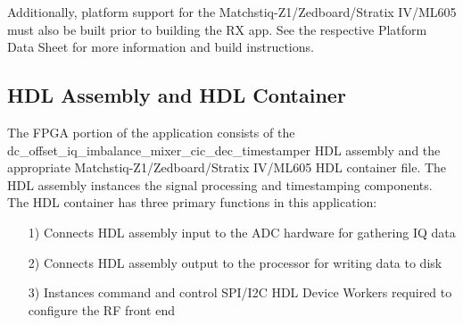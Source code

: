 \noindent Additionally, platform support for the Matchstiq-Z1/Zedboard/Stratix IV/ML605 must also be built prior to building the RX app. See the respective Platform Data Sheet for more information and build instructions.
\newpage

\subsection{HDL Assembly and HDL Container}
The FPGA portion of the application consists of the dc\_offset\_iq\_imbalance\_mixer\_cic\_dec\_timestamper HDL assembly and the appropriate  Matchstiq-Z1/Zedboard/Stratix IV/ML605 HDL container file. The HDL assembly instances the signal processing and timestamping components. The HDL container has three primary functions in this application:
\begin{itemize}
	\item[1)] Connects HDL assembly input to the ADC hardware for gathering IQ data
	\item[2)] Connects HDL assembly output to the processor for writing data to disk
	\item[3)] Instances command and control SPI/I2C HDL Device Workers required to configure the RF front end
\end{itemize}
